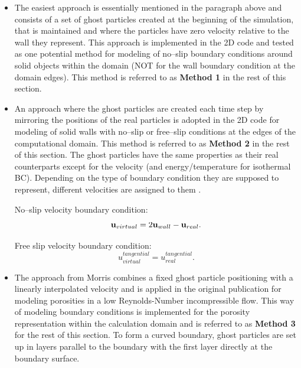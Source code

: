 \documentclass{report}
\begin{document}
\begin{itemize}
\item The easiest approach is essentially mentioned in the paragraph above and consists of a set of ghost particles created at the beginning of the simulation, that is maintained and where the particles have zero velocity relative to the wall they represent. This approach is implemented in the 2D code and tested as one potential method for modeling of no--slip boundary conditions around solid objects within the domain (NOT for the wall boundary condition at the domain edges). This method is referred to as {\bf Method 1} in the rest of this section.

 \item An approach where the ghost particles are created each time step by mirroring the positions of the real particles is adopted in the 2D code for modeling of solid walls with no--slip or free--slip conditions at the edges of the computational domain. This method is referred to as {\bf Method 2} in the rest of this section.
The ghost particles have the same properties as their real counterparts
except for the velocity (and energy/temperature for isothermal BC). Depending on the type of boundary condition they are
supposed to represent, different velocities are assigned to them \cite{Hu2006}.

No--slip velocity boundary condition:
\begin{equation}
{\bf u}_{virtual}=2{\bf u}_{wall}-{\bf u}_{real}.
\end{equation}

Free slip velocity boundary condition:
\begin{equation}
u_{virtual}^{tangential}=u_{real}^{tangential}.
\end{equation}


\item The approach from Morris \cite{Morris1997, Zhu1999} combines a fixed ghost particle positioning with a linearly interpolated velocity and is applied in the original publication for modeling porosities in a low Reynolds-Number incompressible flow.
This way of modeling boundary conditions is implemented for the porosity representation within the calculation domain and is referred to as {\bf Method 3} for the rest of this section.
To form a curved boundary, ghost particles are set up in layers parallel to the boundary with the first layer directly at the boundary surface. 


\end{itemize}
\end{document}

